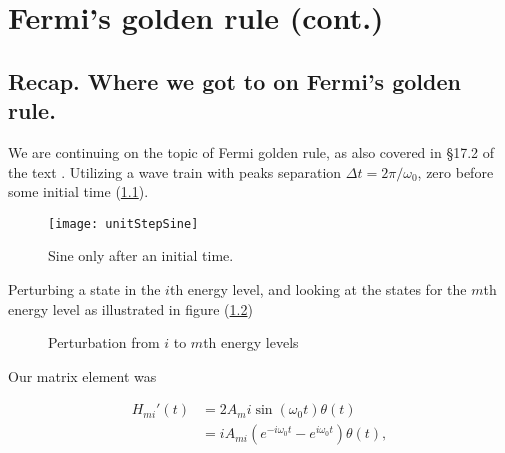%
%

\chapter{Fermi's golden rule (cont.)}
\label{chap:qmTwoL10}
{}
\date{Oct 10, 2011}

\beginArtWithToc

%

\section{Recap. Where we got to on Fermi's golden rule.}

We are continuing on the topic of Fermi golden rule, as also covered in \S 17.2 of the text \cite{desai2009quantum}.  Utilizing a wave train with peaks separation $\Delta t = 2\pi/\omega_0$, zero before some initial time (\ref{fig:qmTwoL10:unitStepSine}).

\begin{figure}[htp]
   \centering
   \texttt{[image: unitStepSine]}
   \caption{Sine only after an initial time.}\label{fig:qmTwoL10:unitStepSine}
\end{figure}

Perturbing a state in the $i$th energy level, and looking at the states for the $m$th energy level as illustrated in figure (\ref{fig:qmTwoL10:2})

\begin{figure}[htp]
   \centering
   \def\svgwidth{0.3\columnwidth}
%
   \caption{Perturbation from $i$ to $m$th energy levels}\label{fig:qmTwoL10:2}
\end{figure}

Our matrix element was

\begin{equation}\label{eqn:qmTwoL10:10}
\begin{aligned}
H_{mi}'(t) 
&= 2 A_mi \sin(\omega_0 t) \theta(t) \\
&= i A_{mi} ( e^{-i \omega_0 t} - e^{i \omega_0 t} ) \theta(t),
\end{aligned}
\end{equation}

